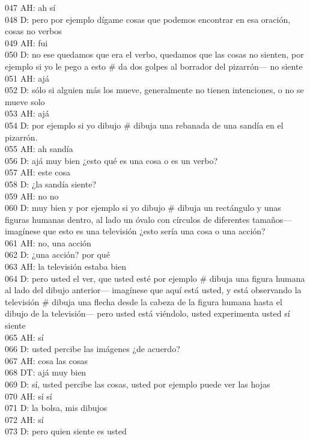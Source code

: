 047 AH: ah sí\\
048 D: pero por ejemplo dígame cosas que podemos encontrar en esa oración, cosas no verbos\\
049 AH: fui\\
050 D: no ese quedamos que era el verbo, quedamos que las cosas no sienten, por ejemplo si yo le pego a esto \# da dos golpes al borrador del pizarrón--- no siente\\
051 AH: ajá\\
052 D: sólo si alguien más los mueve, generalmente no tienen intenciones, o no se mueve solo\\
053 AH: ajá\\
054 D: por ejemplo si yo dibujo \# dibuja una rebanada de una sandía en el pizarrón.\\
055 AH: ah sandía\\
056 D: ajá muy bien ¿esto qué es una cosa o es un verbo?\\
057 AH: este cosa\\
058 D: ¿la sandía siente?\\
059 AH: no no\\
060 D: muy bien y por ejemplo si yo dibujo \# dibuja un rectángulo y unas figuras humanas dentro, al lado un óvalo con círculos de diferentes tamaños--- imagínese que esto es una televisión ¿esto sería una cosa o una acción?\\
061 AH: no, una acción\\
062 D: ¿una acción? por qué\\
063 AH: la televisión estaba bien\\
064 D: pero usted el ver, que usted esté por ejemplo \# dibuja una figura humana al lado del dibujo anterior--- imagínese que aquí está usted, y está observando la televisión \# dibuja una flecha desde la cabeza de la figura humana hasta el dibujo de la televisión--- pero usted está viéndolo, usted experimenta usted sí siente\\
065 AH: sí\\
066 D: usted percibe las imágenes ¿de acuerdo?\\
067 AH: cosa las cosas\\
068 DT: ajá muy bien\\
069 D: sí, usted percibe las cosas, usted por ejemplo puede ver las hojas\\
070 AH: sí sí\\
071 D: la bolsa, mis dibujos\\
072 AH: sí\\
073 D: pero quien siente es usted\\
